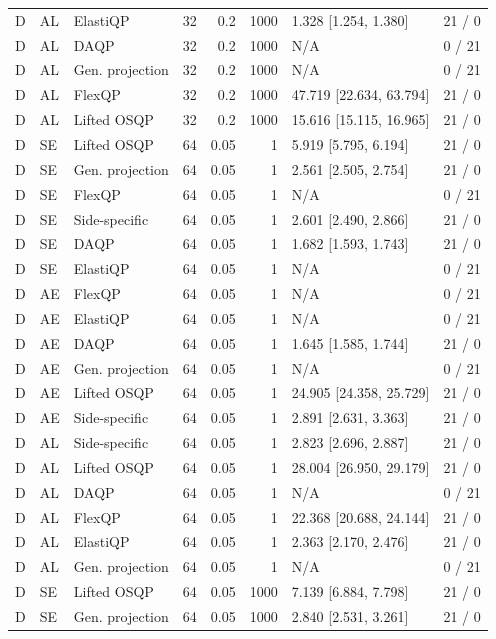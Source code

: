 \begin{longtable}{@{}lllrrrlr@{}}
D & AL & ElastiQP & 32 & 0.2 & 1000 & 1.328 [1.254, 1.380] & 21 / 0 \\
D & AL & DAQP & 32 & 0.2 & 1000 & N/A & 0 / 21 \\
D & AL & Gen. projection & 32 & 0.2 & 1000 & N/A & 0 / 21 \\
D & AL & FlexQP & 32 & 0.2 & 1000 & 47.719 [22.634, 63.794] & 21 / 0 \\
D & AL & Lifted OSQP & 32 & 0.2 & 1000 & 15.616 [15.115, 16.965] & 21 / 0 \\
D & SE & Lifted OSQP & 64 & 0.05 & 1 & 5.919 [5.795, 6.194] & 21 / 0 \\
D & SE & Gen. projection & 64 & 0.05 & 1 & 2.561 [2.505, 2.754] & 21 / 0 \\
D & SE & FlexQP & 64 & 0.05 & 1 & N/A & 0 / 21 \\
D & SE & Side-specific & 64 & 0.05 & 1 & 2.601 [2.490, 2.866] & 21 / 0 \\
D & SE & DAQP & 64 & 0.05 & 1 & 1.682 [1.593, 1.743] & 21 / 0 \\
D & SE & ElastiQP & 64 & 0.05 & 1 & N/A & 0 / 21 \\
D & AE & FlexQP & 64 & 0.05 & 1 & N/A & 0 / 21 \\
D & AE & ElastiQP & 64 & 0.05 & 1 & N/A & 0 / 21 \\
D & AE & DAQP & 64 & 0.05 & 1 & 1.645 [1.585, 1.744] & 21 / 0 \\
D & AE & Gen. projection & 64 & 0.05 & 1 & N/A & 0 / 21 \\
D & AE & Lifted OSQP & 64 & 0.05 & 1 & 24.905 [24.358, 25.729] & 21 / 0 \\
D & AE & Side-specific & 64 & 0.05 & 1 & 2.891 [2.631, 3.363] & 21 / 0 \\
D & AL & Side-specific & 64 & 0.05 & 1 & 2.823 [2.696, 2.887] & 21 / 0 \\
D & AL & Lifted OSQP & 64 & 0.05 & 1 & 28.004 [26.950, 29.179] & 21 / 0 \\
D & AL & DAQP & 64 & 0.05 & 1 & N/A & 0 / 21 \\
D & AL & FlexQP & 64 & 0.05 & 1 & 22.368 [20.688, 24.144] & 21 / 0 \\
D & AL & ElastiQP & 64 & 0.05 & 1 & 2.363 [2.170, 2.476] & 21 / 0 \\
D & AL & Gen. projection & 64 & 0.05 & 1 & N/A & 0 / 21 \\
D & SE & Lifted OSQP & 64 & 0.05 & 1000 & 7.139 [6.884, 7.798] & 21 / 0 \\
D & SE & Gen. projection & 64 & 0.05 & 1000 & 2.840 [2.531, 3.261] & 21 / 0 \\

\end{longtable}
